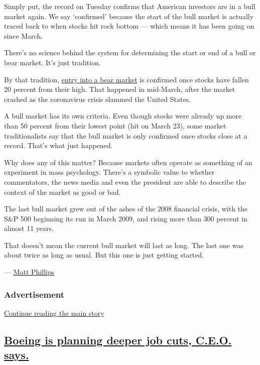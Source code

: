 Simply put, the record on Tuesday confirms that American investors are
in a bull market again. We say `confirmed' because the start of the bull
market is actually traced back to when stocks hit rock bottom --- which
means it has been going on since March.

There's no science behind the system for determining the start or end of
a bull or bear market. It's just tradition.

By that tradition,
\href{https://www.nytimes3xbfgragh.onion/2020/03/11/business/bear-market-stocks-dow.html}{entry
into a bear market} is confirmed once stocks have fallen 20 percent from
their high. That happened in mid-March, after the market crashed as the
coronavirus crisis slammed the United States.

A bull market has its own criteria. Even though stocks were already up
more than 50 percent from their lowest point (hit on March 23), some
market traditionalists say that the bull market is only confirmed once
stocks close at a record. That's what just happened.

Why does any of this matter? Because markets often operate as something
of an experiment in mass psychology. There's a symbolic value to whether
commentators, the news media and even the president are able to describe
the context of the market as good or bad.

The last bull market grew out of the ashes of the 2008 financial crisis,
with the S\&P 500 beginning its run in March 2009, and rising more than
300 percent in almost 11 years.

That doesn't mean the current bull market will last as long. The last
one was about twice as long as usual. But this one is just getting
started.

--- \href{https://www.nytimes3xbfgragh.onion/by/matt-phillips}{Matt
Phillips}

\hypertarget{advertisement}{%
\subsubsection{Advertisement}\label{advertisement}}

\protect\hyperlink{after-dfp-ad-mid1}{Continue reading the main story}

\hypertarget{boeing-is-planning-deeper-job-cuts-ceo-says}{%
\subsection{\texorpdfstring{\protect\hyperlink{boeing-is-planning-deeper-job-cuts-ceo-says}{Boeing
is planning deeper job cuts, C.E.O.
says.}}{Boeing is planning deeper job cuts, C.E.O. says.}}\label{boeing-is-planning-deeper-job-cuts-ceo-says}}

